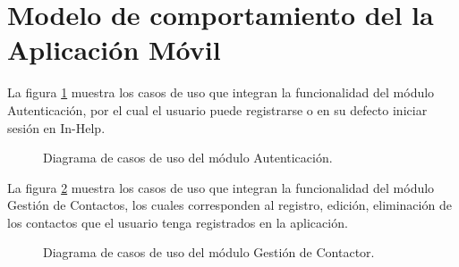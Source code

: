 \newpage
\section{Modelo de comportamiento del la Aplicación Móvil}

La figura \ref{fig:casosUso:aute} muestra los casos de uso que integran la funcionalidad del módulo Autenticación, por el cual el usuario puede registrarse o en su defecto iniciar sesión en In-Help.
%
\begin{figure}[htpb!]
	\begin{center}
		\caption{Diagrama de casos de uso del módulo Autenticación. \label{fig:casosUso:aute}}
	\end{center}
\end{figure}
\clearpage



La figura \ref{fig:casosUso:conta} muestra los casos de uso que integran la funcionalidad del módulo Gestión de Contactos, los cuales corresponden al registro, edición, eliminación de los contactos que el usuario tenga registrados en la aplicación.
%
\begin{figure}[htpb!]
	\begin{center}
		\caption{Diagrama de casos de uso del módulo Gestión de Contactor. \label{fig:casosUso:conta}}
	\end{center}
\end{figure}
\clearpage


